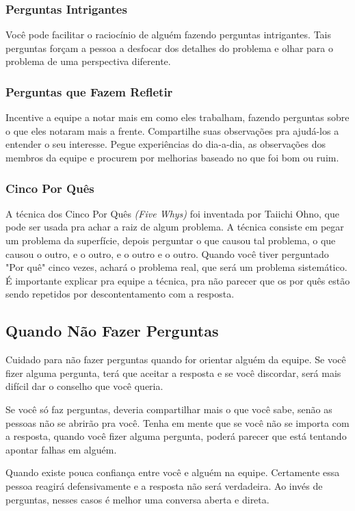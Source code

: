 \documentclass[a4paper, 10pt, font=plain]{abnt}
\begin{document}
\subsubsection{Perguntas Intrigantes}
Você pode facilitar o raciocínio de alguém fazendo perguntas intrigantes. Tais perguntas forçam a pessoa a desfocar dos detalhes do problema e olhar para o problema de uma perspectiva diferente.

\subsubsection{Perguntas que Fazem Refletir}
Incentive a equipe a notar mais em como eles trabalham, fazendo perguntas sobre o que eles notaram mais a frente. Compartilhe suas observações pra ajudá-los a entender o seu interesse. Pegue experiências do dia-a-dia, as observações dos membros da equipe e procurem por melhorias baseado no que foi bom ou ruim.

\subsubsection{Cinco Por Quês}
A técnica dos Cinco Por Quês \textit{(Five Whys)} foi inventada por Taiichi Ohno, que pode ser usada pra achar a raiz de algum problema. A técnica consiste em pegar um problema da superfície, depois perguntar o que causou tal problema, o que causou o outro, e o outro, e o outro e o outro. Quando você tiver perguntado "Por quê" cinco vezes, achará o problema real, que será um problema sistemático. É importante explicar pra equipe a técnica, pra não parecer que os por quês estão sendo repetidos por descontentamento com a resposta.


\subsection{Quando Não Fazer Perguntas}
Cuidado para não fazer perguntas quando for orientar alguém da equipe. Se você fizer alguma pergunta, terá que aceitar a resposta e se você discordar, será mais difícil dar o conselho que você queria.

Se você só faz perguntas, deveria compartilhar mais o que você sabe, senão as pessoas não se abrirão pra você. Tenha em mente que se você não se importa com a resposta, quando você fizer alguma pergunta, poderá parecer que está tentando apontar falhas em alguém.

Quando existe pouca confiança entre você e alguém na equipe. Certamente essa pessoa reagirá defensivamente e a resposta não será verdadeira. Ao invés de perguntas, nesses casos é melhor uma conversa aberta e direta.
\end{document}

